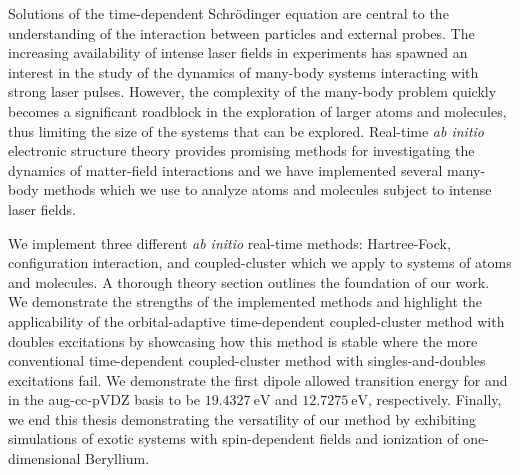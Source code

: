 Solutions of the time-dependent Schrödinger equation are central to the
understanding of the interaction between particles and external probes.
The increasing availability of intense laser fields in experiments has spawned
an interest in the study of the dynamics of many-body systems interacting with
strong laser pulses.
However, the complexity of the many-body problem quickly becomes a significant
roadblock in the exploration of larger atoms and molecules, thus limiting the
size of the systems that can be explored.
Real-time \textit{ab initio} electronic structure theory provides promising
methods for investigating the dynamics of matter-field interactions and we have
implemented several many-body methods which we use to analyze atoms and
molecules subject to intense laser fields.

We implement three different \emph{ab initio} real-time methods: Hartree-Fock,
configuration interaction, and coupled-cluster which we apply to systems of
atoms and molecules.
A thorough theory section outlines the foundation of our work.
We demonstrate the strengths of the implemented methods and highlight the
applicability of the orbital-adaptive time-dependent coupled-cluster method with
doubles excitations by showcasing how this method is stable where the more
conventional time-dependent coupled-cluster method with singles-and-doubles
excitations fail.
We demonstrate the first dipole allowed transition energy for  and
 in the aug-cc-pVDZ basis to be $\SI{19.4327}{\electronvolt}$ and
$\SI{12.7275}{\electronvolt}$, respectively.
Finally, we end this thesis demonstrating the versatility of our method by
exhibiting simulations of exotic systems with spin-dependent fields and
ionization of one-dimensional Beryllium.
